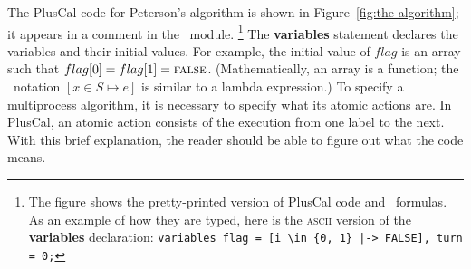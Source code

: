 \documentclass[a4paper,draft]{llncs}
\renewcommand{\FALSE}{\textsc{false}}
\begin{document}
%
The PlusCal code for Peterson's algorithm is shown in
Figure~\ref{fig:the-algorithm}; it appears in a comment in the \tlaplus\ module.%
\footnote{The figure shows the pretty-printed version of PlusCal code
  and \tlaplus\ formulas.  As an example of how they are typed,
  here is the \textsc{ascii} version of the \textbf{variables}
  declaration:\quad
  \texttt{variables flag = [i \textbackslash in \{0, 1\} |-> FALSE], turn = 0;}
}
The \textbf{variables} statement declares the variables and their initial
values. For example, the initial value of $flag$ is an array such that
$flag[0]=flag[1]=\FALSE$. (Mathematically, an array is a function; the
\tlaplus\ notation $[x \in S \mapsto e]$ is similar to a lambda expression.)
To specify a multiprocess
algorithm, it is necessary to specify what its atomic actions are.  In
PlusCal, an atomic action consists of the execution from one label to the
next.  With this brief explanation, the reader should be able to
figure out what the code means.
\end{document}
